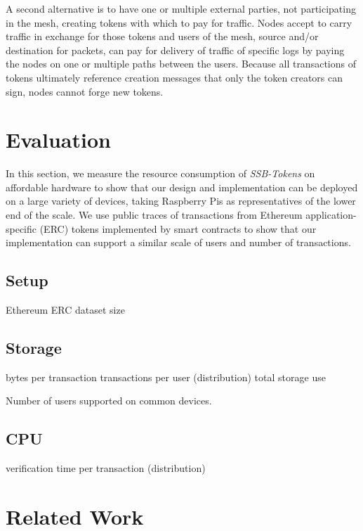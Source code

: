 \documentclass[sigplan,screen,10pt]{acmart}
\newcommand\ssbtokens[0]{\textit{SSB-Tokens} }
\begin{document}
A second alternative is to have one or multiple external parties, not participating in the mesh, creating tokens with which to pay for traffic. Nodes accept to carry traffic in exchange for those tokens and users of the mesh, source and/or destination for packets, can pay for delivery of traffic of specific logs by paying the nodes on one or multiple paths between the users. Because all transactions of tokens ultimately reference creation messages that only the token creators can sign, nodes cannot forge new tokens.

\section{Evaluation}
\label{section:evaluation}

In this section, we measure the resource consumption of \ssbtokens on affordable hardware to show that our design and implementation can be deployed on a large variety of devices, taking Raspberry Pis as representatives of the lower end of the scale. We use public traces of transactions from Ethereum application-specific (ERC) tokens implemented by smart contracts to show that our implementation can support a similar scale of users and number of transactions.

\subsection{Setup}

Ethereum ERC dataset size

\subsection{Storage}
\label{section:storage}

bytes per transaction
transactions per user (distribution)
total storage use

Number of users supported on common devices.

\subsection{CPU}

verification time per transaction (distribution)

\section{Related Work}
\label{section:related-work}
\end{document}
